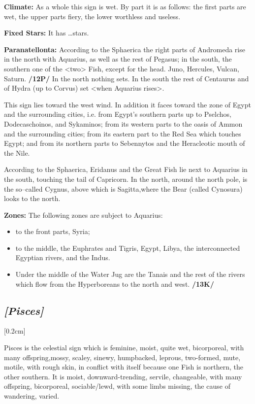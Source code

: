 \textbf{Climate:} As a whole this sign is wet. By part it is as follows: the first parts are wet, the upper parts fiery, the lower worthless and useless. 

\textbf{Fixed Stars:} It has …stars. 

\textbf{Paranatellonta:} According to the Sphaerica the right parts of Andromeda rise in the north with Aquarius, as well as the rest of Pegasus; in the south, the southern one of the <two> Fish, except for the head. Juno, Hercules, Vulcan, Saturn. \textbf{/12P/} In the north nothing sets. In the south
the rest of Centaurus and of Hydra (up to Corvus) set <when Aquarius rises>. 

This sign lies toward the west wind. In addition it faces toward the zone of Egypt and the surrounding cities, i.e. from Egypt’s southern parts up to Pselchos, Dodecaschoinos, and Sykaminos; from its western parts to the oasis of Ammon and the surrounding cities; from its eastern part to the Red Sea which touches Egypt; and from its
northern parts to Sebennytos and the Heracleotic mouth of the Nile.

According to the Sphaerica, Eridanus and the Great Fish lie next to Aquarius in the south, touching the tail of Capricorn. In the north, around the north pole, is the so–called Cygnus, above which is Sagitta,where the Bear (called Cynosura) looks to the north. 

\textbf{Zones:} The following zones are subject to Aquarius:
\begin{itemize}
\item to the front parts, Syria; 
\item to the middle, the Euphrates and Tigris, Egypt, Libya, the interconnected Egyptian rivers, and the Indus. 
\item Under the middle of the Water Jug are the Tanais and the rest of the rivers which flow from the Hyperboreans to the north and west. \textbf{/13K/}
\end{itemize}

\secbr
\subsection{\textit{[Pisces]}}
[0.2cm]

Pisces is the celestial sign which is feminine, moist, quite wet, bicorporeal, with many offspring,mossy, scaley, sinewy, humpbacked, leprous, two-formed, mute, motile, with rough skin, in conflict with itself because one Fish is northern, the other southern. It is moist, downward-trending, servile, changeable, with many offspring, bicorporeal, sociable/lewd, with some limbs missing, the cause of wandering, varied.

